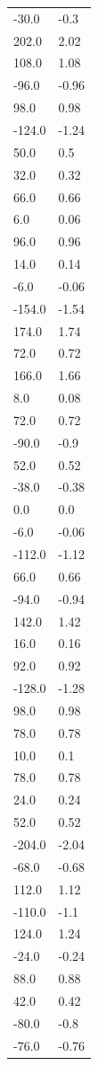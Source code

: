 \begin{longtable}{ll}
-30.0 & -0.3 \\
202.0 & 2.02 \\
108.0 & 1.08 \\
-96.0 & -0.96 \\
98.0 & 0.98 \\
-124.0 & -1.24 \\
50.0 & 0.5 \\
32.0 & 0.32 \\
66.0 & 0.66 \\
6.0 & 0.06 \\
96.0 & 0.96 \\
14.0 & 0.14 \\
-6.0 & -0.06 \\
-154.0 & -1.54 \\
174.0 & 1.74 \\
72.0 & 0.72 \\
166.0 & 1.66 \\
8.0 & 0.08 \\
72.0 & 0.72 \\
-90.0 & -0.9 \\
52.0 & 0.52 \\
-38.0 & -0.38 \\
0.0 & 0.0 \\
-6.0 & -0.06 \\
-112.0 & -1.12 \\
66.0 & 0.66 \\
-94.0 & -0.94 \\
142.0 & 1.42 \\
16.0 & 0.16 \\
92.0 & 0.92 \\
-128.0 & -1.28 \\
98.0 & 0.98 \\
78.0 & 0.78 \\
10.0 & 0.1 \\
78.0 & 0.78 \\
24.0 & 0.24 \\
52.0 & 0.52 \\
-204.0 & -2.04 \\
-68.0 & -0.68 \\
112.0 & 1.12 \\
-110.0 & -1.1 \\
124.0 & 1.24 \\
-24.0 & -0.24 \\
88.0 & 0.88 \\
42.0 & 0.42 \\
-80.0 & -0.8 \\
-76.0 & -0.76 \\

\end{longtable}
